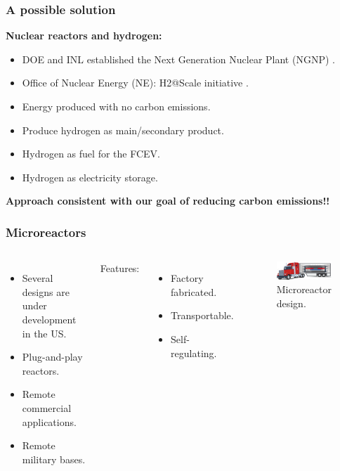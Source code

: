 \begin{frame}
\frametitle{A possible solution}
    \textbf{Nuclear reactors and hydrogen:}
    \begin{itemize}
    	\item DOE and INL established the Next Generation Nuclear Plant (NGNP) \cite{us_nrc_next_2017}.
		\item Office of Nuclear Energy (NE): H2@Scale initiative \cite{office_of_nuclear_energy_could_2018}.
	\end{itemize}

	\begin{itemize}
		\item Energy produced with no carbon emissions.
		\item Produce hydrogen as main/secondary product.
		\item Hydrogen as fuel for the FCEV.
		\item Hydrogen as electricity storage.
	\end{itemize}

	\centering
	\vspace{1cm}
	\textbf{Approach consistent with our goal of reducing carbon emissions!!}
\end{frame}


\begin{frame}
\frametitle{Microreactors}
\begin{columns}
	\column[t]{5cm}
	\begin{itemize}
		\item Several designs are under development in the US.
		\item Plug-and-play reactors.
		\item Remote commercial applications.
		\item Remote military bases.
	\end{itemize}
	\vspace{1cm}
	Features:
	\begin{itemize}
		\item Factory fabricated.
		\item Transportable.
		\item Self-regulating.
	\end{itemize}

    \column[t]{5cm}
	\begin{figure}[htbp!]
		\begin{center}
			\includegraphics[width=5.2cm]{images/microreactor}
		\end{center}
		\caption{Microreactor design.}
	\end{figure}
\end{columns}
\end{frame}

